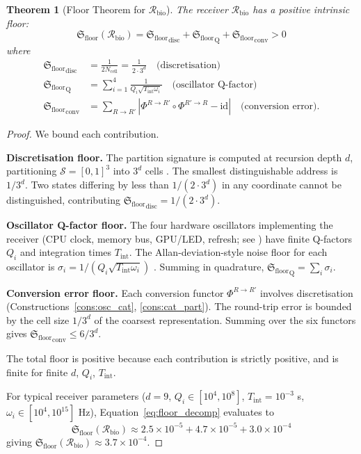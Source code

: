 \documentclass[11pt,twocolumn,a4paper]{article}
\newtheorem{theorem}{Theorem}[section]
\theoremstyle{definition}
\theoremstyle{remark}
\newcommand{\Sspace}{\mathcal{S}}
\newcommand{\Recv}{\mathcal{R}}
\newcommand{\Floor}{{\mathfrak{S}_{\mathrm{floor}}}}
\begin{document}
\begin{theorem}[Floor Theorem for $\Recv_{\mathrm{bio}}$]
\label{thm:floor}
The receiver $\Recv_{\mathrm{bio}}$ has a positive intrinsic floor:
\begin{equation}
\Floor(\Recv_{\mathrm{bio}}) = \Floor_{\mathrm{disc}} + \Floor_{\mathrm{Q}} + \Floor_{\mathrm{conv}} > 0
\label{eq:floor_decomp}
\end{equation}
where
\begin{align}
\Floor_{\mathrm{disc}} &= \frac{1}{2 N_{\mathrm{cell}}} = \frac{1}{2 \cdot 3^d} \quad \text{(discretisation)} \\
\Floor_{\mathrm{Q}} &= \sum_{i=1}^{4} \frac{1}{Q_i \sqrt{T_{\mathrm{int}} \omega_i}} \quad \text{(oscillator Q-factor)} \\
\Floor_{\mathrm{conv}} &= \sum_{R \to R'} |\Phi^{R \to R'} \circ \Phi^{R' \to R} - \mathrm{id}| \quad \text{(conversion error)}.
\end{align}
\end{theorem}

\begin{proof}
We bound each contribution.

\textbf{Discretisation floor.} The partition signature is computed at recursion depth $d$, partitioning $\Sspace = [0,1]^3$ into $3^d$ cells \citep{sachikonye2025c}. The smallest distinguishable address is $1/3^d$. Two states differing by less than $1/(2 \cdot 3^d)$ in any coordinate cannot be distinguished, contributing $\Floor_{\mathrm{disc}} = 1/(2 \cdot 3^d)$.

\textbf{Oscillator Q-factor floor.} The four hardware oscillators implementing the receiver (CPU clock, memory bus, GPU/LED, refresh; see \citep{sachikonye2025_strobes}) have finite Q-factors $Q_i$ and integration times $T_{\mathrm{int}}$. The Allan-deviation-style noise floor for each oscillator is $\sigma_i = 1/(Q_i \sqrt{T_{\mathrm{int}} \omega_i})$ \citep{allan1966}. Summing in quadrature, $\Floor_{\mathrm{Q}} = \sum_i \sigma_i$.

\textbf{Conversion error floor.} Each conversion functor $\Phi^{R \to R'}$ involves discretisation (Constructions~\ref{cons:osc_cat}, \ref{cons:cat_part}). The round-trip error is bounded by the cell size $1/3^d$ of the coarsest representation. Summing over the six functors gives $\Floor_{\mathrm{conv}} \leq 6/3^d$.

The total floor is positive because each contribution is strictly positive, and is finite for finite $d$, $Q_i$, $T_{\mathrm{int}}$.

For typical receiver parameters ($d = 9$, $Q_i \in [10^4, 10^8]$, $T_{\mathrm{int}} = 10^{-3}$ s, $\omega_i \in [10^4, 10^{15}]$ Hz), Equation~\eqref{eq:floor_decomp} evaluates to
\begin{equation}
\Floor(\Recv_{\mathrm{bio}}) \approx 2.5 \times 10^{-5} + 4.7 \times 10^{-5} + 3.0 \times 10^{-4}
\end{equation}
giving $\Floor(\Recv_{\mathrm{bio}}) \approx 3.7 \times 10^{-4}$.
\end{proof}
\end{document}
